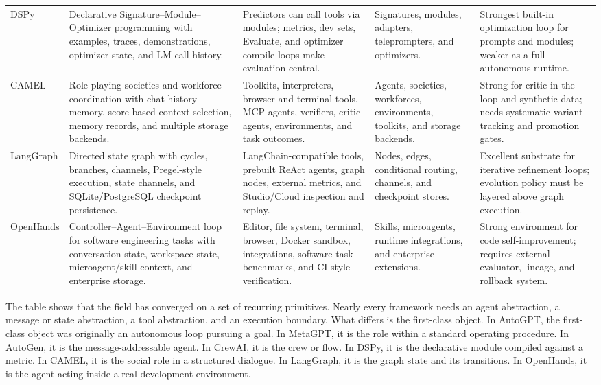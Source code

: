 {\begin{longtable}{@{}L{0.12\textwidth}L{0.22\textwidth}L{0.20\textwidth}L{0.16\textwidth}L{0.25\textwidth}@{}}
\cite{dspy2023} DSPy & Declarative Signature--Module--Optimizer programming with examples, traces, demonstrations, optimizer state, and LM call history. & Predictors can call tools via modules; metrics, dev sets, Evaluate, and optimizer compile loops make evaluation central. & Signatures, modules, adapters, teleprompters, and optimizers. & Strongest built-in optimization loop for prompts and modules; weaker as a full autonomous runtime. \\
\cite{camel2023} CAMEL & Role-playing societies and workforce coordination with chat-history memory, score-based context selection, memory records, and multiple storage backends. & Toolkits, interpreters, browser and terminal tools, MCP agents, verifiers, critic agents, environments, and task outcomes. & Agents, societies, workforces, environments, toolkits, and storage backends. & Strong for critic-in-the-loop and synthetic data; needs systematic variant tracking and promotion gates. \\
\cite{langgraph2024} LangGraph & Directed state graph with cycles, branches, channels, Pregel-style execution, state channels, and SQLite/PostgreSQL checkpoint persistence. & LangChain-compatible tools, prebuilt ReAct agents, graph nodes, external metrics, and Studio/Cloud inspection and replay. & Nodes, edges, conditional routing, channels, and checkpoint stores. & Excellent substrate for iterative refinement loops; evolution policy must be layered above graph execution. \\
\cite{openhands2024} OpenHands & Controller--Agent--Environment loop for software engineering tasks with conversation state, workspace state, microagent/skill context, and enterprise storage. & Editor, file system, terminal, browser, Docker sandbox, integrations, software-task benchmarks, and CI-style verification. & Skills, microagents, runtime integrations, and enterprise extensions. & Strong environment for code self-improvement; requires external evaluator, lineage, and rollback system. \\
\end{longtable}}

The table shows that the field has converged on a set of recurring primitives.  Nearly every framework needs an agent abstraction, a message or state abstraction, a tool abstraction, and an execution boundary.  What differs is the first-class object.  In AutoGPT, the first-class object was originally an autonomous loop pursuing a goal.  In MetaGPT, it is the role within a standard operating procedure.  In AutoGen, it is the message-addressable agent.  In CrewAI, it is the crew or flow.  In DSPy, it is the declarative module compiled against a metric.  In CAMEL, it is the social role in a structured dialogue.  In LangGraph, it is the graph state and its transitions.  In OpenHands, it is the agent acting inside a real development environment.

